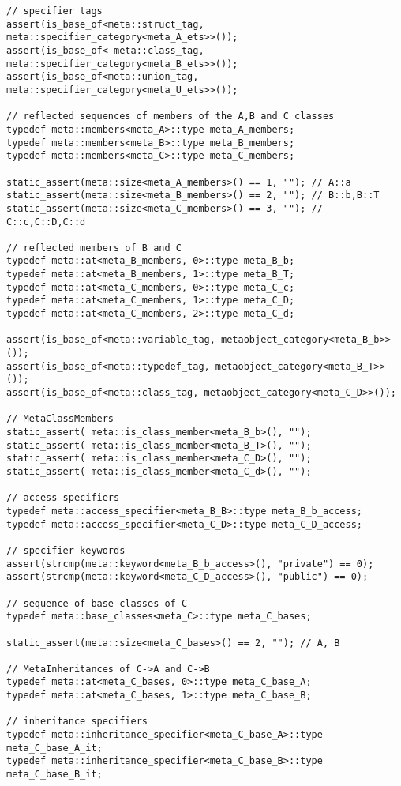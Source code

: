 \begin{verbatim}
// specifier tags
assert(is_base_of<meta::struct_tag, meta::specifier_category<meta_A_ets>>());
assert(is_base_of< meta::class_tag, meta::specifier_category<meta_B_ets>>());
assert(is_base_of<meta::union_tag, meta::specifier_category<meta_U_ets>>());

// reflected sequences of members of the A,B and C classes
typedef meta::members<meta_A>::type meta_A_members;
typedef meta::members<meta_B>::type meta_B_members;
typedef meta::members<meta_C>::type meta_C_members;

static_assert(meta::size<meta_A_members>() == 1, ""); // A::a
static_assert(meta::size<meta_B_members>() == 2, ""); // B::b,B::T
static_assert(meta::size<meta_C_members>() == 3, ""); // C::c,C::D,C::d

// reflected members of B and C
typedef meta::at<meta_B_members, 0>::type meta_B_b;
typedef meta::at<meta_B_members, 1>::type meta_B_T;
typedef meta::at<meta_C_members, 0>::type meta_C_c;
typedef meta::at<meta_C_members, 1>::type meta_C_D;
typedef meta::at<meta_C_members, 2>::type meta_C_d;

assert(is_base_of<meta::variable_tag, metaobject_category<meta_B_b>>());
assert(is_base_of<meta::typedef_tag, metaobject_category<meta_B_T>>());
assert(is_base_of<meta::class_tag, metaobject_category<meta_C_D>>());

// MetaClassMembers
static_assert( meta::is_class_member<meta_B_b>(), "");
static_assert( meta::is_class_member<meta_B_T>(), "");
static_assert( meta::is_class_member<meta_C_D>(), "");
static_assert( meta::is_class_member<meta_C_d>(), "");

// access specifiers
typedef meta::access_specifier<meta_B_B>::type meta_B_b_access;
typedef meta::access_specifier<meta_C_D>::type meta_C_D_access;

// specifier keywords
assert(strcmp(meta::keyword<meta_B_b_access>(), "private") == 0);
assert(strcmp(meta::keyword<meta_C_D_access>(), "public") == 0);

// sequence of base classes of C
typedef meta::base_classes<meta_C>::type meta_C_bases;

static_assert(meta::size<meta_C_bases>() == 2, ""); // A, B

// MetaInheritances of C->A and C->B
typedef meta::at<meta_C_bases, 0>::type meta_C_base_A;
typedef meta::at<meta_C_bases, 1>::type meta_C_base_B;

// inheritance specifiers
typedef meta::inheritance_specifier<meta_C_base_A>::type meta_C_base_A_it;
typedef meta::inheritance_specifier<meta_C_base_B>::type meta_C_base_B_it;


\end{verbatim}
